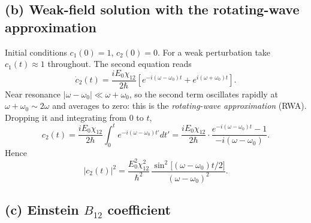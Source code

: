 \documentclass[11pt]{article}
\begin{document}
\subsection*{(b) Weak-field solution with the rotating-wave approximation}

Initial conditions $c_1(0)=1$, $c_2(0)=0$. For a weak perturbation take $c_1(t)\approx 1$ throughout. The second equation reads
\begin{equation*}
    \dot c_2(t) = \frac{iE_0\chi_{12}}{2\hbar}\left[e^{-i(\omega-\omega_0)t}+e^{i(\omega+\omega_0)t}\right].
\end{equation*}
Near resonance $|\omega-\omega_0|\ll\omega+\omega_0$, so the second term oscillates rapidly at $\omega+\omega_0\sim 2\omega$ and averages to zero: this is the \emph{rotating-wave approximation} (RWA). Dropping it and integrating from $0$ to $t$,
\begin{equation*}
    c_2(t) = \frac{iE_0\chi_{12}}{2\hbar}\int_0^t e^{-i(\omega-\omega_0)t'}dt' = \frac{iE_0\chi_{12}}{2\hbar}\cdot\frac{e^{-i(\omega-\omega_0)t}-1}{-i(\omega-\omega_0)}.
\end{equation*}
Hence
\begin{equation}
    \boxed{\;|c_2(t)|^2 = \frac{E_0^2\chi_{12}^2}{\hbar^2}\,\frac{\sin^2\!\bigl[(\omega-\omega_0)t/2\bigr]}{(\omega-\omega_0)^2}.\;}\label{eq:c2sq}
\end{equation}

\subsection*{(c) Einstein $B_{12}$ coefficient}
\end{document}
